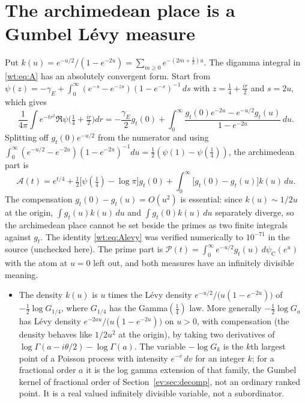 \section{The archimedean place is a Gumbel L\'evy measure}\label{wt:sec:gumbel}

\begin{resultpar}\label{wt:res:acomp}
Put $k(u)=e^{-u/2}/(1-e^{-2u})=\sum_{m\ge0}e^{-(2m+\frac12)u}$. The digamma integral in \eqref{wt:eq:A} has an absolutely convergent form. Start from $\psi(z)=-\gamma_E+\int_0^\infty(e^{-s}-e^{-zs})(1-e^{-s})^{-1}\,ds$ with $z=\frac14+\frac{ir}2$ and $s=2u$, which gives
\begin{equation}\label{wt:eq:Alevy}
\frac1{4\pi}\int e^{-tr^2}\Re\psi\big(\tfrac14+\tfrac{ir}2\big)dr=-\frac{\gamma_E}2g_t(0)+\int_0^\infty\frac{g_t(0)e^{-2u}-e^{-u/2}g_t(u)}{1-e^{-2u}}\,du .
\end{equation}
Splitting off $g_t(0)e^{-u/2}$ from the numerator and using $\int_0^\infty(e^{-u/2}-e^{-2u})(1-e^{-2u})^{-1}du=\frac12(\psi(1)-\psi(\frac14))$, the archimedean part is
\begin{equation}\label{wt:eq:Acomp}
\mathcal A(t)=e^{t/4}+\tfrac12\big[\psi(\tfrac14)-\log\pi\big]g_t(0)+\int_0^\infty\big[g_t(0)-g_t(u)\big]k(u)\,du .
\end{equation}
The compensation $g_t(0)-g_t(u)=O(u^2)$ is essential: since $k(u)\sim1/2u$ at the origin, $\int g_t(u)k(u)\,du$ and $\int g_t(0)k(u)\,du$ separately diverge, so the archimedean place cannot be set beside the primes as two finite integrals against $g_t$. The identity \eqref{wt:eq:Alevy} was verified numerically to $10^{-71}$ in the source (unchecked here). The prime part is $\mathcal P(t)=\int_0^\infty e^{-u/2}g_t(u)\,d\psi_{\mathrm C}(e^u)$ with the atom at $u=0$ left out, and both measures have an infinitely divisible meaning.
\begin{itemize}
\item The density $k(u)$ is $u$ times the L\'evy density $e^{-u/2}/\big(u(1-e^{-2u})\big)$ of $-\frac12\log G_{1/4}$, where $G_{1/4}$ has the Gamma$(\frac14)$ law. More generally $-\frac12\log G_a$ has L\'evy density $e^{-2au}/\big(u(1-e^{-2u})\big)$ on $u>0$, with compensation (the density behaves like $1/2u^2$ at the origin), by taking two derivatives of $\log\Gamma(a-i\theta/2)-\log\Gamma(a)$. The variable $-\log G_k$ is the $k$th largest point of a Poisson process with intensity $e^{-v}\,dv$ for an integer $k$; for a fractional order $a$ it is the log gamma extension of that family, the Gumbel kernel of fractional order of Section~\ref{ev:sec:decomp}, not an ordinary ranked point. It is a real valued infinitely divisible variable, not a subordinator.

\end{itemize}
\end{resultpar}
